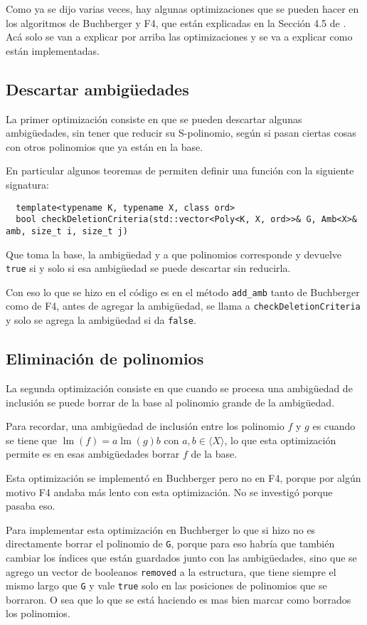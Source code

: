 \documentclass[12pt]{report}
\theoremstyle{customstyle}
\theoremstyle{factstyle}
\DeclareMathOperator{\lm}{lm}
\begin{document}
Como ya se dijo varias veces, hay algunas optimizaciones que se pueden hacer en los algoritmos de Buchberger y F4, que están explicadas en la Sección 4.5 de \cite{thesis:Hof20}. Acá solo se van a explicar por arriba las optimizaciones y se va a explicar como están implementadas.

\subsection{Descartar ambigüedades}

La primer optimización consiste en que se pueden descartar algunas ambigüedades, sin tener que reducir su S-polinomio, según si pasan ciertas cosas con otros polinomios que ya están en la base.

En particular algunos teoremas de \cite{thesis:Hof20} permiten definir una función con la siguiente signatura:

\begin{verbatim}
  template<typename K, typename X, class ord>
  bool checkDeletionCriteria(std::vector<Poly<K, X, ord>>& G, Amb<X>& amb, size_t i, size_t j)
\end{verbatim}

Que toma la base, la ambigüedad y a que polinomios corresponde y devuelve \texttt{true} si y solo si esa ambigüedad se puede descartar sin reducirla.

Con eso lo que se hizo en el código es en el método \texttt{add\_amb} tanto de Buchberger como de F4, antes de agregar la ambigüedad, se llama a \texttt{checkDeletionCriteria} y solo se agrega la ambigüedad si da \texttt{false}.

\subsection{Eliminación de polinomios}

La segunda optimización consiste en que cuando se procesa una ambigüedad de inclusión se puede borrar de la base al polinomio grande de la ambigüedad.

Para recordar, una ambigüedad de inclusión entre los polinomio $f$ y $g$ es cuando se tiene que $\lm(f) = a \lm(g) b$ con $a, b ∈ ⟨X⟩$, lo que esta optimización permite es en esas ambigüedades borrar $f$ de la base.

Esta optimización se implementó en Buchberger pero no en F4, porque por algún motivo F4 andaba más lento con esta optimización. No se investigó porque pasaba eso.

Para implementar esta optimización en Buchberger lo que si hizo no es directamente borrar el polinomio de \texttt{G}, porque para eso habría que también cambiar los índices que están guardados junto con las ambigüedades, sino que se agrego un vector de booleanos \texttt{removed} a la estructura, que tiene siempre el mismo largo que \texttt{G} y vale \texttt{true} solo en las posiciones de polinomios que se borraron. O sea que lo que se está haciendo es mas bien marcar como borrados los polinomios.
\end{document}
